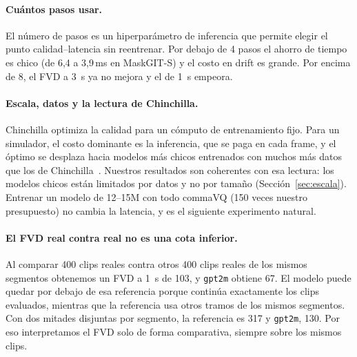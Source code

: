 \documentclass[10pt,twocolumn,a4paper]{article}
\DeclareRobustCommand{\editado}[1]{\textcolor{editado}{#1}}
\DeclareRobustCommand{\editado}[1]{#1}
\newcommand{\ms}{\,ms}
\begin{document}
\paragraph{Cuántos pasos usar.} El número de pasos es un hiperparámetro de inferencia que permite elegir el punto calidad--latencia sin reentrenar. Por debajo de 4 pasos el ahorro de tiempo es chico (\editado{de 6,4 a 3,9\ms} en MaskGIT-S) y el costo en drift es grande. Por encima de 8, el FVD a 3~s ya no mejora y el de 1~s empeora.

\paragraph{Escala, datos y la lectura de Chinchilla.} Chinchilla optimiza la calidad para un cómputo de entrenamiento fijo. Para un simulador, el costo dominante es la inferencia, que se paga en cada frame, y el óptimo se desplaza hacia modelos más chicos entrenados con muchos más datos que los de Chinchilla~\cite{sardana2024beyond}. Nuestros resultados son coherentes con esa lectura: los modelos chicos están limitados por datos y no por tamaño (Sección~\ref{sec:escala}). Entrenar un modelo de 12--15M con todo commaVQ (150 veces nuestro presupuesto) \editado{no cambia la latencia, y es el siguiente experimento natural}.

\paragraph{El FVD real contra real no es una cota inferior.} Al comparar 400 clips reales contra otros 400 clips reales de los mismos segmentos obtenemos un FVD a 1~s de 103, y \texttt{gpt2m} obtiene 67. El modelo puede quedar por debajo de esa referencia porque continúa exactamente los clips evaluados, mientras que la referencia usa otros tramos de los mismos segmentos. Con dos mitades disjuntas por segmento, la referencia es 317 y \texttt{gpt2m}, 130. Por eso interpretamos el FVD solo de forma comparativa, siempre sobre los mismos clips.
\end{document}
